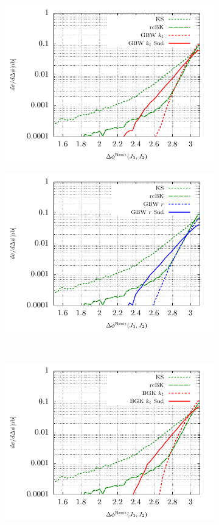 \documentclass[11pt]{article}
\numberwithin{equation}{section}
\numberwithin{table}{section}
\numberwithin{figure}{section}
\begin{document}
\begin{figure}[p]
\begin{subfigure}{0.5\textwidth}
		\includegraphics[width=\textwidth]{plots/plotGBW2Jets}
	\end{subfigure}
	\begin{subfigure}{0.5\textwidth}
		\includegraphics[width=\textwidth]{plots/plotGBW3Jets}
	\end{subfigure}\\
	\begin{subfigure}{0.5\textwidth}
		\includegraphics[width=\textwidth]{plots/plotBGK2Jets}

\end{subfigure}
\end{figure}
\end{document}
